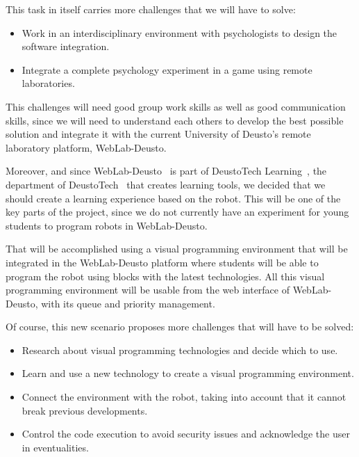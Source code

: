This task in itself carries more challenges that we will have to solve:

\begin{itemize}

\item Work in an interdisciplinary environment with psychologists to design the software
integration.

\item Integrate a complete psychology experiment in a game using remote laboratories.

\end{itemize}

This challenges will need good group work skills as well as good communication skills, since we will
need to understand each others to develop the best possible solution and integrate it with the
current University of Deusto's remote laboratory platform, WebLab-Deusto.

Moreover, and since WebLab-Deusto~\cite{weblab_web} is part of DeustoTech
Learning~\cite{dtlearning_web}, the department of DeustoTech~\cite{deustotech_web} that creates
learning tools, we decided that we should create a learning experience based on the robot. This will
be one of the key parts of the project, since we do not currently have an experiment for young
students to program robots in WebLab-Deusto.

That will be accomplished using a visual programming environment that will be integrated in the
WebLab-Deusto platform where students will be able to program the robot using blocks with the latest
technologies. All this visual programming environment will be usable from the web interface of
WebLab-Deusto, with its queue and priority management.

Of course, this new scenario proposes more challenges that will have to be solved:

\begin{itemize}

\item Research about visual programming technologies and decide which to use.

\item Learn and use a new technology to create a visual programming environment.

\item Connect the environment with the robot, taking into account that it cannot break previous
developments.

\item Control the code execution to avoid security issues and acknowledge the user in eventualities.

\end{itemize}

